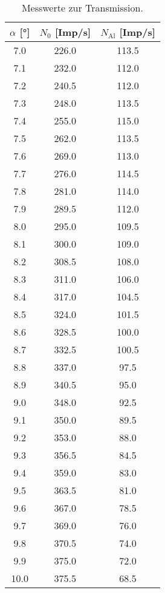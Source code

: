 \begin{table}
    \centering
    \begin{tabular}{c c c}
        \toprule
        $\alpha$ [°] & $N_0$ [Imp/s] & $N_\text{Al}$ [Imp/s] \\
        \midrule
        7.0	&  226.0 & 113.5 \\ 
        7.1	&  232.0 & 112.0 \\
        7.2	&  240.5 & 112.0 \\
        7.3	&  248.0 & 113.5 \\
        7.4	&  255.0 & 115.0 \\
        7.5	&  262.0 & 113.5 \\
        7.6	&  269.0 & 113.0 \\
        7.7	&  276.0 & 114.5 \\
        7.8	&  281.0 & 114.0 \\
        7.9	&  289.5 & 112.0 \\
        8.0	&  295.0 & 109.5 \\
        8.1	&  300.0 & 109.0 \\
        8.2	&  308.5 & 108.0 \\
        8.3	&  311.0 & 106.0 \\
        8.4	&  317.0 & 104.5 \\
        8.5	&  324.0 & 101.5 \\
        8.6	&  328.5 & 100.0 \\
        8.7	&  332.5 & 100.5  \\
        8.8	&  337.0 & 97.5  \\
        8.9	&  340.5 & 95.0  \\
        9.0	&  348.0 & 92.5  \\
        9.1	&  350.0 & 89.5  \\
        9.2	&  353.0 & 88.0  \\
        9.3	&  356.5 & 84.5 \\
        9.4	&  359.0 & 83.0 \\
        9.5	&  363.5 & 81.0 \\
        9.6	&  367.0 & 78.5 \\
        9.7	&  369.0 & 76.0 \\
        9.8	&  370.5 & 74.0 \\
        9.9	&  375.0 & 72.0 \\
        10.0&  375.5 & 68.5 \\
        \bottomrule
    \end{tabular}
    \caption{Messwerte zur Transmission.}
    \label{tab:trans}
\end{table}

